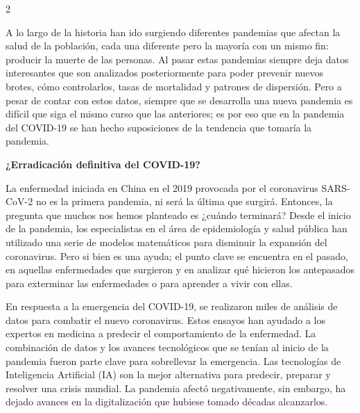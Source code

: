 \documentclass[12pt,spanish,Letterpaper,openany]{book}
\begin{document}
\begin {multicols}{2}

A lo largo de la historia han ido surgiendo diferentes pandemias que afectan la salud de la población, cada una diferente pero la mayoría con un mismo fin: producir la muerte de las personas. Al pasar estas pandemias siempre deja datos interesantes que son analizados posteriormente para poder prevenir nuevos brotes, cómo controlarlos, tasas de mortalidad y patrones de dispersión. Pero a pesar de contar con estos datos, siempre que se desarrolla una nueva pandemia es difícil que siga el mismo curso que las anteriores; es por eso que en la pandemia del COVID-19 se han hecho suposiciones de la tendencia que tomaría la pandemia.

\textbf{¿Erradicación definitiva del COVID-19?}

La enfermedad iniciada en China en el 2019 provocada por el coronavirus SARS-CoV-2 no es la primera pandemia, ni será la última que surgirá. Entonces, la pregunta que muchos nos hemos planteado es ¿cuándo terminará? Desde el inicio de la pandemia, los especialistas en el área de epidemiología y salud pública han utilizado una serie de modelos matemáticos para disminuir la expansión del coronavirus. Pero si bien es una ayuda; el punto clave se encuentra en el pasado, en aquellas enfermedades que surgieron y en analizar qué hicieron los antepasados para exterminar las enfermedades o para aprender a vivir con ellas.

En respuesta a la emergencia del COVID-19, se realizaron miles de análisis de datos para combatir el nuevo coronavirus. Estos ensayos han ayudado a los expertos en medicina a predecir el comportamiento de la enfermedad. La combinación de datos y los avances tecnológicos que se tenían al inicio de la pandemia fueron parte clave para sobrellevar la emergencia. Las tecnologías de Inteligencia Artificial (IA) son la mejor alternativa para predecir, preparar y resolver una crisis mundial. La pandemia afectó negativamente, sin embargo, ha dejado avances en la digitalización que hubiese tomado décadas alcanzarlos.

\begin {flushleft}
\noindent\begin{minipage}[c]{\columnwidth}
\centering


\end{minipage}
\end{flushleft}
\end{multicols}
\end{document}
